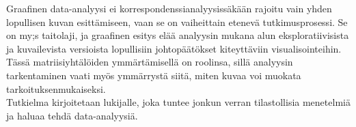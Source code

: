 Graafinen data-analyysi ei korrespondenssianalyysissäkään rajoitu vain yhden lopullisen kuvan esittämiseen, vaan se on vaiheittain etenevä tutkimusprosessi. Se on my;s taitolaji, ja graafinen esitys elää analyysin mukana alun eksploratiivisista ja kuvailevista versioista lopullisiin johtopäätökset kiteyttäviin visualisointeihin. Tässä matriisiyhtälöiden ymmärtämisellä on roolinsa, sillä analyysin tarkentaminen vaati myös ymmärrystä siitä, miten kuvaa voi muokata tarkoituksenmukaiseksi.\\

Tutkielma kirjoitetaan lukijalle, joka tuntee jonkun verran tilastollisia menetelmiä ja haluaa tehdä data-analyysiä.

